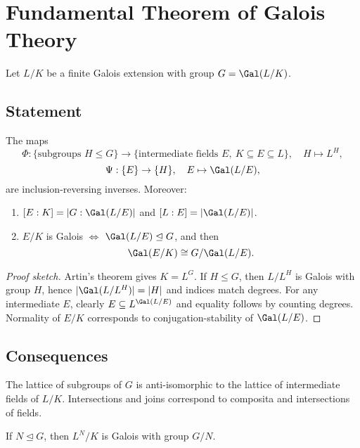 \section{Fundamental Theorem of Galois Theory}

Let $L/K$ be a finite Galois extension with group $G=\Gal(L/K)$.

\subsection{Statement}

\begin{theorem}[FTGT]
The maps
\[
\Phi:\{\text{subgroups }H\le G\}\to\{\text{intermediate fields }E,\ K\subseteq E\subseteq L\},\quad H\mapsto L^{H},
\]
\[
\Psi:\{E\}\to\{H\},\quad E\mapsto \Gal(L/E),
\]
are inclusion-reversing inverses. Moreover:
\begin{enumerate}
\item $[E:K]=|G:\Gal(L/E)|$ and $[L:E]=|\Gal(L/E)|$.
\item $E/K$ is Galois $\iff$ $\Gal(L/E)\trianglelefteq G$, and then
\[
\Gal(E/K)\cong G/\Gal(L/E).
\]
\end{enumerate}
\end{theorem}

\begin{proof}[Proof sketch]
Artin's theorem gives $K=L^{G}$. If $H\le G$, then $L/L^{H}$ is Galois with group $H$, hence $|\Gal(L/L^H)|=|H|$ and indices match degrees. For any intermediate $E$, clearly $E\subseteq L^{\Gal(L/E)}$ and equality follows by counting degrees. Normality of $E/K$ corresponds to conjugation-stability of $\Gal(L/E)$.
\end{proof}

\subsection{Consequences}

\begin{corollary}
The lattice of subgroups of $G$ is anti-isomorphic to the lattice of intermediate fields of $L/K$. Intersections and joins correspond to composita and intersections of fields.
\end{corollary}

\begin{corollary}
If $N\trianglelefteq G$, then $L^{N}/K$ is Galois with group $G/N$.
\end{corollary}

